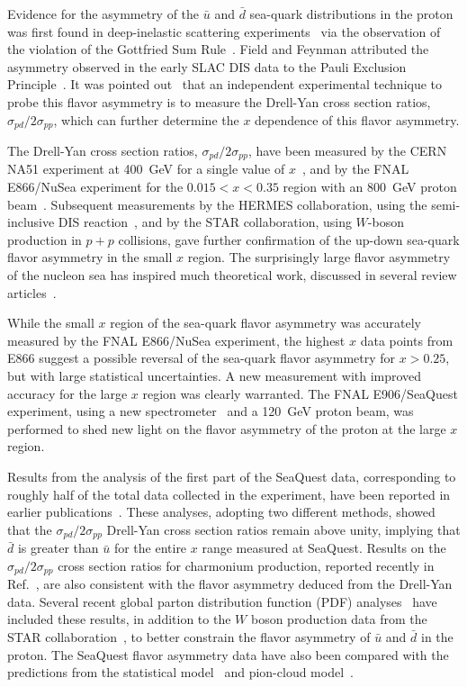 \documentclass[reprint,aps,unsortedaddress,superscriptaddress,prl,floatfix,showpacs,linenumbers]{revtex4-2}
\begin{document}
Evidence for the asymmetry of the $\bar{u}$ and $\bar{d}$ sea-quark
distributions in the proton was first found in
deep-inelastic scattering experiments~\cite{stein1975,amaudruz1991,arneodo1994} via
the observation of the violation
of the Gottfried Sum Rule~\cite{gottfried1967}. Field and Feynman
attributed the asymmetry observed in the early SLAC DIS data to the Pauli
Exclusion Principle~\cite{field1977}. It was pointed out~\cite{ellis1991}
that an independent experimental technique to probe this flavor asymmetry is
to measure the Drell-Yan cross section ratios,
$\sigma_{pd}/2\sigma_{pp}$, which can further determine the $x$ dependence
of this flavor asymmetry.

The Drell-Yan cross section ratios,
$\sigma_{pd}/2\sigma_{pp}$, have been measured by the CERN NA51 experiment at
\SI{400}{\GeV} for a single value of $x$~\cite{NA51:1994xrz}, and by the FNAL
E866/NuSea experiment for the $0.015 < x < 0.35$ region with an \SI{800}{\GeV}
proton beam~\cite{hawker1998,peng1998,towell2001}. Subsequent measurements by the
HERMES collaboration, using the semi-inclusive DIS reaction~\cite{ackerstaff1998},
and by the STAR collaboration, using $W$-boson production in $p+p$ collisions,
gave further confirmation of the up-down sea-quark flavor asymmetry in
the small $x$ region. The surprisingly large flavor asymmetry of the nucleon
sea has inspired much theoretical work, discussed in several review
articles~\cite{kumano1998,vogt2000a,garvey2001,chang2014,geesaman2019}.

While the small $x$ region of the sea-quark flavor asymmetry was accurately
measured by the FNAL E866/NuSea experiment, the highest $x$ data points from
E866 suggest a possible reversal of the sea-quark flavor asymmetry for $x > 0.25$,
but with large statistical uncertainties. A new measurement with improved
accuracy for the large $x$ region was clearly warranted. The FNAL
E906/SeaQuest experiment, using a new spectrometer~\cite{aidala2019} and
a \SI{120}{\GeV} proton beam, was performed to shed new light on the flavor asymmetry
of the proton at the large $x$ region.

Results from the analysis of the first part of the SeaQuest data, corresponding
to roughly half of the total data collected in the experiment, have been reported
in earlier publications~\cite{dove2021,dove2023}.
These analyses, adopting two different methods, showed that the
$\sigma_{pd}/2\sigma_{pp}$ Drell-Yan cross section ratios remain
above unity, implying that
$\bar{d}$ is greater than $\bar{u}$ for the entire $x$ range measured
at SeaQuest. Results on the $\sigma_{pd}/2\sigma_{pp}$  cross section ratios
for charmonium production, reported recently in
Ref.~\cite{leung2024a}, are also consistent with the flavor asymmetry
deduced from the Drell-Yan data.
Several recent global parton distribution function (PDF)
analyses~\cite{cocuzza2021,ball2022a,accardi2023,alekhin2023}
have included these results, in addition to the $W$ boson production data
from the STAR collaboration~\cite{adam2021}, to better constrain the
flavor asymmetry of $\bar u$ and $\bar d$ in the proton. The SeaQuest
flavor asymmetry data have also been compared with the predictions from the
statistical model~\cite{soffer2019} and pion-cloud model~\cite{alberg2022}.
\end{document}
